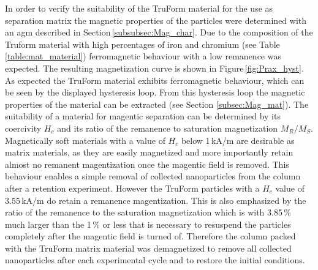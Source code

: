 In order to verify the suitability of the TruForm material for the use as separation matrix the magnetic properties of the particles were determined with an \gls{agm} described in Section\,\ref{subsubsec:Mag_char}. Due to the composition of the Truform material with high percentages of iron and chromium (see Table\,\ref{table:mat_material}) ferromagnetic behaviour with a low remanence was expected. The resulting magnetization curve is shown in Figure\,\ref{fig:Prax_hyst}. As expected the TruForm material exhibits ferromagnetic behaviour, which can be seen by the displayed hysteresis loop. From this hysteresis loop the magnetic properties of the material can be extracted (see Section \ref{subsec:Mag_mat}). The suitability of a material for magentic separation can be determined by its coercivity $H_{c}$ and its ratio of the remanence to saturation magnetization $M_{R}/M_{S}$. Magnetically soft materials with a value of $H_{c}$ below 1\,kA/m are desirable as matrix materials, as they are easily magnetized and more importantly retain almost no remanent magentization once the magentic field is removed. This behaviour enables a simple removal of collected nanoparticles from the column after a retention experiment. However the TruForm particles with a $H_{c}$ value of 3.55\,kA/m do retain a remanence magentization. This is also emphasized by the ratio of the remanence to the saturation magnetization which is with 3.85\,\% much larger than the 1\,\% or less that is necessary to resuspend the particles completely after the magentic field is turned of. Therefore the column packed with the TruForm matrix material was demagnetized to remove all collected nanoparticles after each experimental cycle and to restore the initial conditions.\\ 

